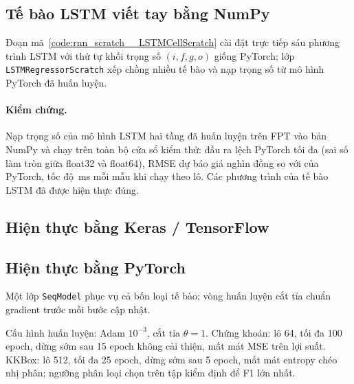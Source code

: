 
\subsection{Tế bào LSTM viết tay bằng NumPy}

Đoạn mã~\ref{code:rnn_scratch__LSTMCellScratch} cài đặt trực tiếp sáu phương trình LSTM với thứ tự khối trọng số
$(i, f, g, o)$ giống PyTorch; lớp \texttt{LSTMRegressorScratch} xếp chồng nhiều tế bào và nạp trọng số từ mô hình PyTorch
đã huấn luyện.


\paragraph{Kiểm chứng.} Nạp trọng số của mô hình LSTM hai tầng đã huấn luyện trên FPT vào bản NumPy và chạy trên toàn bộ
 cửa sổ kiểm thử: đầu ra lệch PyTorch tối đa  (sai số làm tròn
giữa float32 và float64), RMSE dự báo giá  nghìn đồng so với
 của PyTorch, tốc độ \,ms mỗi mẫu khi chạy theo
lô. Các phương trình của tế bào LSTM đã được hiện thực đúng.

\subsection{Hiện thực bằng Keras / TensorFlow}


\subsection{Hiện thực bằng PyTorch}

Một lớp \texttt{SeqModel} phục vụ cả bốn loại tế bào; vòng huấn luyện cắt tỉa chuẩn gradient trước mỗi bước cập nhật.


Cấu hình huấn luyện: Adam $10^{-3}$, cắt tỉa $\theta = 1$. Chứng khoán: lô 64, tối đa 100 epoch, dừng sớm sau 15 epoch không
cải thiện, mất mát MSE trên lợi suất. KKBox: lô 512, tối đa 25 epoch, dừng sớm sau 5 epoch, mất mát entropy chéo nhị phân;
ngưỡng phân loại chọn trên tập kiểm định để F1 lớn nhất.

